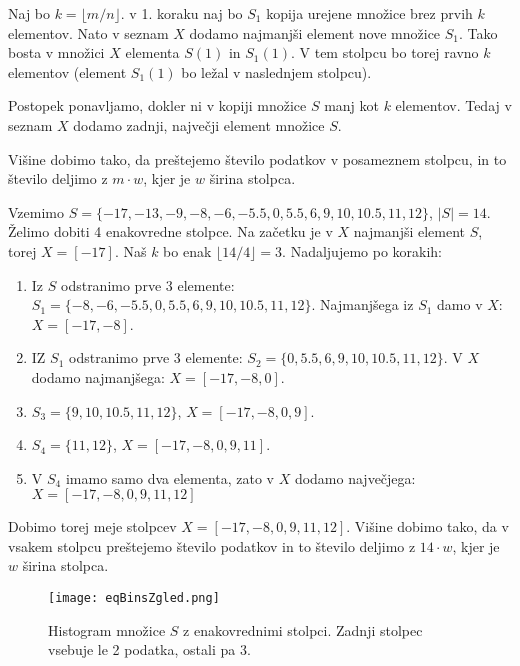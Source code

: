 Naj bo $k = \lfloor m/n \rfloor$. v 1. koraku naj bo $S_1$ kopija urejene množice brez prvih $k$ elementov. Nato v seznam $X$ dodamo najmanjši element nove množice $S_1$. Tako bosta v množici $X$ elementa $S(1)$ in $S_1(1)$. V tem stolpcu bo torej ravno $k$ elementov (element $S_1(1)$ bo ležal v naslednjem stolpcu).

Postopek ponavljamo, dokler ni v kopiji množice $S$ manj kot $k$ elementov. Tedaj v seznam $X$ dodamo zadnji, največji element množice $S$.

Višine dobimo tako, da preštejemo število podatkov v posameznem stolpcu, in to število deljimo z $m\cdot w$, kjer je $w$ širina stolpca.

\begin{zgled}
    Vzemimo $S = \{-17, -13, -9, -8, -6, -5.5, 0, 5.5, 6, 9, 10, 10.5, 11, 12\}$, $|S| = 14$. Želimo dobiti 4 enakovredne stolpce. Na začetku je v $X$ najmanjši element $S$, torej $X = [-17]$. Naš $k$ bo enak $\lfloor 14/4\rfloor = 3$. Nadaljujemo po korakih:
    \begin{enumerate}
        \item Iz $S$ odstranimo prve 3 elemente: $S_1 = \{-8, -6, -5.5, 0, 5.5, 6, 9, 10, 10.5, 11, 12\}$. Najmanjšega iz $S_1$ damo v $X$: $X = [-17, -8]$.
        \item IZ $S_1$ odstranimo prve 3 elemente: $S_2 = \{0, 5.5, 6, 9, 10, 10.5, 11, 12\}$. V $X$ dodamo najmanjšega: $X = [-17,-8,0]$.
        \item $S_3 = \{9, 10, 10.5, 11, 12\}$, $X = [-17,-8,0,9]$.
        \item $S_4 = \{11, 12\}$, $X = [-17,-8,0,9,11]$.
        \item V $S_4$ imamo samo dva elementa, zato v $X$ dodamo največjega: $X = [-17,-8,0,9,11,12]$
    \end{enumerate}
    Dobimo torej meje stolpcev $X=[-17,-8,0,9,11,12]$. Višine dobimo tako, da v vsakem stolpcu preštejemo število podatkov in to število deljimo z $14\cdot w$, kjer je $w$ širina stolpca.

    \begin{figure}[!h]
        \centering
        \texttt{[image: eqBinsZgled.png]}
        \caption{Histogram množice $S$ z enakovrednimi stolpci. Zadnji stolpec vsebuje le 2 podatka, ostali pa 3.}
    \end{figure}

\end{zgled}